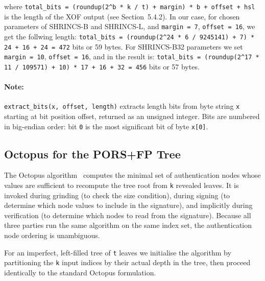 where \texttt{total\_bits = (roundup(2\string^b * k / t) + margin) * b + offset + hsl} is the length of the XOF output (see Section~5.4.2). 
In our case, for chosen parameters of SHRINCS-B and SHRINCS-L, and \texttt{margin = 7}, \texttt{offset = 16}, we get the follwing length: \texttt{total\_bits = (roundup(2\string^24 * 6 / 9245141) + 7) * 24 + 16 + 24 = 472} bits or 59 bytes.
For SHRINCS-B32 parameters we set \texttt{margin = 10}, \texttt{offset = 16}, and in the result is: \texttt{total\_bits = (roundup(2\string^17 * 11 / 109571) + 10) * 17 + 16 + 32 = 456} bits or 57 bytes.

\paragraph{Note:} \texttt{extract\_bits(x, offset, length)} extracts length bits from byte string \texttt{x} starting at bit position offset, returned as an unsigned integer. Bits are numbered in big-endian order: bit \texttt{0} is the most significant bit of byte \texttt{x[0]}.

\subsection{Octopus for the PORS+FP Tree}
 
The Octopus algorithm~\cite{pors_octopus2018} computes the minimal set of authentication
nodes whose values are sufficient to recompute the tree root from \texttt{k} revealed
leaves. It is invoked during grinding (to check the size condition), during signing
(to determine which node values to include in the signature), and implicitly during
verification (to determine which nodes to read from the signature). Because all
three parties run the same algorithm on the same index set, the authentication node
ordering is unambiguous.
 
For an imperfect, left-filled tree of \texttt{t} leaves we initialise the algorithm by
partitioning the \texttt{k} input indices by their actual depth in the tree,
then proceed identically to the standard Octopus formulation.
 
